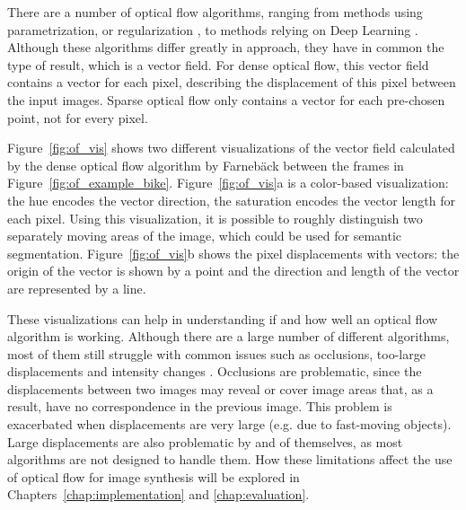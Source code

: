 There are a number of optical flow algorithms, ranging from methods using parametrization, or regularization \cite{of-survey}, to methods relying on Deep Learning \cite{of-deep}. Although these algorithms differ greatly in approach, they have in common the type of result, which is a vector field. For dense optical flow, this vector field contains a vector for each pixel, describing the displacement of this pixel between the input images. Sparse optical flow only contains a vector for each pre-chosen point, not for every pixel.

Figure~\ref{fig:of_vis} shows two different visualizations of the vector field calculated by the dense optical flow algorithm by Farneb\"ack \cite{farneback} between the frames in Figure~\ref{fig:of_example_bike}. Figure~\ref{fig:of_vis}a is a color-based visualization: the hue encodes the vector direction, the saturation encodes the vector length for each pixel. Using this visualization, it is possible to roughly distinguish two separately moving areas of the image, which could be used for semantic segmentation. Figure~\ref{fig:of_vis}b shows the pixel displacements with vectors: the origin of the vector is shown by a point and the direction and length of the vector are represented by a line.

These visualizations can help in understanding if and how well an optical flow algorithm is working. Although there are a large number of different algorithms, most of them still struggle with common issues such as occlusions, too-large displacements and intensity changes \cite{of-survey}. Occlusions are problematic, since the displacements between two images may reveal or cover image areas that, as a result, have no correspondence in the previous image. This problem is exacerbated when displacements are very large (e.g. due to fast-moving objects). Large displacements are also problematic by and of themselves, as most algorithms are not designed to handle them. How these limitations affect the use of optical flow for image synthesis will be explored in Chapters~\ref{chap:implementation} and \ref{chap:evaluation}.

